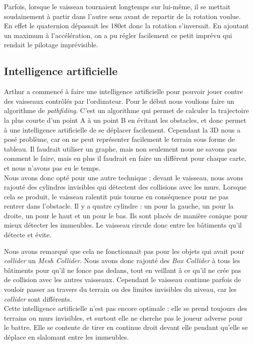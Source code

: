 \documentclass[10pt, titlepage]{report}
\begin{document}
Parfois, lorsque le vaisseau tournaient longtemps sur lui-même, il se mettait soudainement à partir dans l'autre sens avant de repartir de la rotation voulue. En effet le quaternion dépassait les 180\textdegree  et donc la rotation s'inversait. En ajoutant un maximum à l'accélération, on a pu régler facilement ce petit imprévu qui rendait le pilotage imprévisible.\\

\subsection{Intelligence artificielle}

Arthur a commencé à faire une intelligence artificielle pour pouvoir jouer contre des vaisseaux contrôlés par l'ordinateur. Pour le début nous voulions faire un algorithme de \textit{pathfiding}. C'est un algorithme qui permet de calculer la trajectoire la plus courte d'un point A à un point B en évitant les obstacles, et donc permet à une intelligence artificielle de se déplacer facilement. Cependant la 3D nous a posé problème, car on ne peut représenter facilement le terrain sous forme de tableau. Il faudrait utiliser un graphe, mais non seulement nous ne savons pas comment le faire, mais en plus il faudrait en faire un différent pour chaque carte, et nous n'avons pas eu le temps.\\

Nous avons donc opté pour une autre technique : devant le vaisseau, nous avons rajouté des cylindres invisibles qui détectent des collisions avec les murs. Lorsque cela se produit, le vaisseau ralentit puis tourne en conséquence pour ne pas rentrer dans l'obstacle. Il y a quatre cylindre : un pour la gauche, un pour la droite, un pour le haut et un pour le bas. Ils sont placés de manière conique pour mieux détecter les immeubles. Le vaisseau circule donc entre les bâtiments qu'il détecte et évite.

Nous avons remarqué que cela ne fonctionnait pas pour les objets qui avait pour \textit{collider} un\textit{ Mesh Collider}. Nous avons donc rajouté des \textit{Box Collider} à tous les bâtiments pour qu'il ne fonce pas dedans, tout en veillant à ce qu'il ne crée pas de collision avec les autres vaisseaux. Cependant le vaisseau continue parfois de vouloir passer au travers du terrain ou des limites invisibles du niveau, car les \textit{collider} sont différents.\\

Cette intelligence artificielle n'est pas encore optimale : elle se prend toujours des terrains ou murs invisibles, et surtout elle ne cherche pas le joueur adverse pour le battre. Elle se contente de tirer en continue droit devant elle pendant qu'elle se déplace en slalomant entre les immeubles.\\
\end{document}
